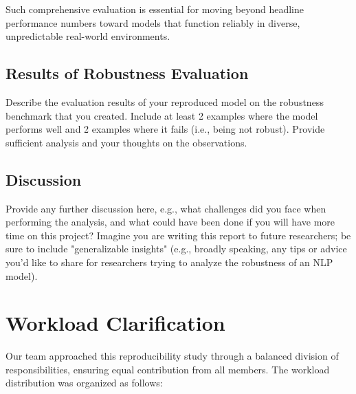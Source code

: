 \documentclass[11pt,a4paper]{article}
\begin{document}
Such comprehensive evaluation is essential for moving beyond headline performance numbers toward models that function reliably in diverse, unpredictable real-world environments.

\subsection{Results of Robustness Evaluation}
Describe the evaluation results of your reproduced model on the robustness benchmark that you created. Include at least 2 examples where the model performs well and 2 examples where it fails (i.e., being not robust). Provide sufficient analysis and your thoughts on the observations.

\subsection{Discussion} 
Provide any further discussion here, e.g., what challenges did you face when performing the analysis, and what could have been done if you will have more time on this project? Imagine you are writing this report to future researchers; be sure to include "generalizable insights" (e.g., broadly speaking, any tips or advice you'd like to share for researchers trying to analyze the robustness of an NLP model).

\section{Workload Clarification}

Our team approached this reproducibility study through a balanced division of responsibilities, ensuring equal contribution from all members. The workload distribution was organized as follows:
\end{document}
